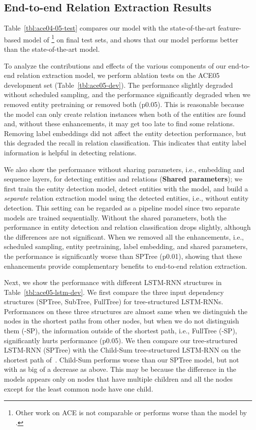 \documentclass[11pt]{article}
\begin{document}
\subsection{End-to-end Relation Extraction Results}

Table~\ref{tbl:ace04-05-test} compares our model with the state-of-the-art feature-based model of \footnote{Other work on ACE is not comparable or performs worse than the model by .} on final test sets, and shows that our model performs better than the state-of-the-art model. 

To analyze the contributions and effects of the various components of our end-to-end relation extraction model, 
we perform ablation tests on the ACE05 development set (Table~\ref{tbl:ace05-dev}).
The performance slightly degraded without scheduled sampling, and the performance significantly degraded when we removed entity pretraining or removed both (p0.05).
This is reasonable because the model can only create relation instances when both of the entities are found and, without these enhancements, it may get too late to find some relations. 
Removing label embeddings did not affect the entity detection performance, but this degraded the recall in relation classification. This indicates that entity label information is helpful in detecting relations. 

We also show the performance without sharing parameters, i.e., embedding and sequence layers, for detecting entities and relations ({\bf Shared parameters}); we first train the entity detection model, detect entities with the model, and build a {\it separate} relation extraction model using the detected entities, i.e., without entity detection. This setting can be regarded as a pipeline model since two separate models are trained sequentially. 
Without the shared parameters, both the performance in entity detection and relation classification
drops slightly, although the differences are not significant.
When we removed all the enhancements, i.e., scheduled sampling, entity pretraining, label embedding, and shared parameters, the performance is significantly worse than SPTree (p0.01), showing that these enhancements provide complementary benefits to end-to-end relation extraction.

Next, we show the performance with different LSTM-RNN structures in Table~\ref{tbl:ace05-lstm-dev}.
We first compare the three input dependency structures (SPTree, SubTree, FullTree) 
for tree-structured LSTM-RNNs. 
Performances on these three structures are almost same when we distinguish the nodes in the shortest paths from other nodes, but when we do not distinguish them (-SP), the information outside of the shortest path, i.e., FullTree (-SP), significantly hurts performance (p0.05).
We then compare our tree-structured LSTM-RNN (SPTree) with the Child-Sum tree-structured LSTM-RNN on the shortest path of~. Child-Sum performs worse than our SPTree model, but not with as big of a decrease as above.
This may be because the difference in the models appears only on nodes that have multiple children and all the nodes except for the least common node have one child.
\end{document}
